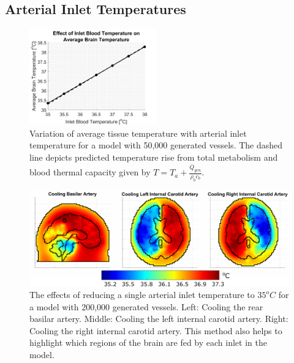 \documentclass[11pt,english,a4paper,twoside,openright]{report}
\begin{document}
{{{{{{{{\subsection{Arterial Inlet Temperatures} 

\begin{figure}[h]
	\centering
	\includegraphics[width=0.49\textwidth]{Chapter3/InletTemperatures}
	\caption[Variation of average tissue temperature with arterial inlet temperature for a model with 50,000 generated vessels]{Variation of average tissue temperature with arterial inlet temperature for a model with 50,000 generated vessels. The dashed line depicts predicted temperature rise from total metabolism and blood thermal capacity given by $T = T_{a}+\frac{\overline{Q}_{gen}}{\rho_{b}c_{b}}$.}
	\label{fig:InletTemperatures}
\end{figure}

\begin{figure}[h]
	\centering
	\includegraphics[width=\textwidth]{Chapter3/SpecificInletTemperatures}
	\caption[The effects of reducing a single arterial inlet temperature to $35^{o}C$ for a model with 200,000 generated vessels]{The effects of reducing a single arterial inlet temperature to $35^{o}C$ for a model with 200,000 generated vessels. Left: Cooling the rear basilar artery. Middle: Cooling the left internal carotid artery. Right: Cooling the right internal carotid artery. This method also helps to highlight which regions of the brain are fed by each inlet in the model.}
	\label{fig:SpecificInletTemperatures}
\end{figure}

}}}}}}}}
\end{document}
